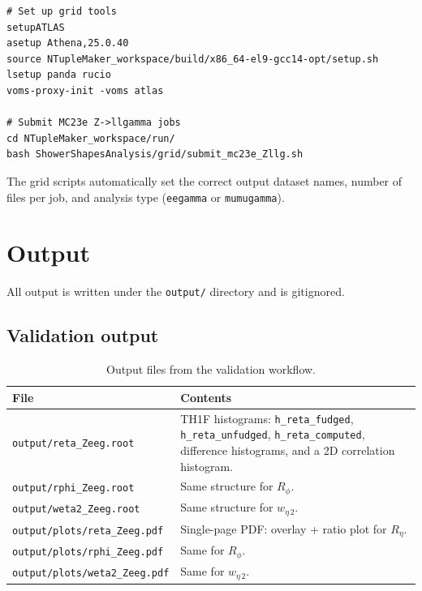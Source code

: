 \documentclass[12pt,a4paper]{article}
\begin{document}
\begin{lstlisting}
# Set up grid tools
setupATLAS
asetup Athena,25.0.40
source NTupleMaker_workspace/build/x86_64-el9-gcc14-opt/setup.sh
lsetup panda rucio
voms-proxy-init -voms atlas

# Submit MC23e Z->llgamma jobs
cd NTupleMaker_workspace/run/
bash ShowerShapesAnalysis/grid/submit_mc23e_Zllg.sh
\end{lstlisting}

The grid scripts automatically set the correct output dataset names,
number of files per job, and analysis type (\texttt{eegamma} or
\texttt{mumugamma}).

\section{Output}
\label{sec:output}

All output is written under the \texttt{output/} directory and is
gitignored.

\subsection{Validation output}

\begin{table}[htbp]
\centering
\caption{Output files from the validation workflow.}
\label{tab:output:validation}
\small
\begin{tabular}{lp{8cm}}
\toprule
\textbf{File} & \textbf{Contents} \\
\midrule
\texttt{output/reta\_Zeeg.root}
  & TH1F histograms: \texttt{h\_reta\_fudged},
    \texttt{h\_reta\_unfudged}, \texttt{h\_reta\_computed},
    difference histograms, and a 2D correlation histogram. \\
\texttt{output/rphi\_Zeeg.root}
  & Same structure for $R_\phi$. \\
\texttt{output/weta2\_Zeeg.root}
  & Same structure for $w_{\eta\,2}$. \\
\texttt{output/plots/reta\_Zeeg.pdf}
  & Single-page PDF: overlay + ratio plot for $R_\eta$. \\
\texttt{output/plots/rphi\_Zeeg.pdf}
  & Same for $R_\phi$. \\
\texttt{output/plots/weta2\_Zeeg.pdf}
  & Same for $w_{\eta\,2}$. \\
\bottomrule
\end{tabular}
\end{table}
\end{document}
